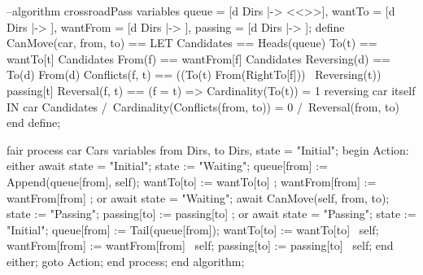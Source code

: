 \documentclass[14pt, openany]{book}
\begin{document}
\begin{ppcal}
--algorithm crossroadPass
variables
  queue = [d \in Dirs |-> <<>>],
  wantTo = [d \in Dirs |-> {}],
  wantFrom = [d \in Dirs |-> {}],
  passing = [d \in Dirs |-> {}];
define
  CanMove(car, from, to) == 
    LET
      Candidates == Heads(queue)
      To(t) == wantTo[t] \intersect Candidates
      From(f) == wantFrom[f] \intersect Candidates
      Reversing(d) == To(d) \intersect From(d) 
      Conflicts(f, t) == ((To(t) \intersect From(RightTo[f])) \ Reversing(t)) \union passing[t]
      Reversal(f, t) == (f = t) => Cardinality(To(t)) = 1 \* reversing car itself
    IN
    car \in Candidates /\
    Cardinality(Conflicts(from, to)) = 0 /\
    Reversal(from, to)
end define;

fair process car \in Cars
variables
  from \in Dirs, to \in Dirs, state = "Initial";
begin
  Action:
    either
      await state = "Initial";
      state := "Waiting";
      queue[from] := Append(queue[from], self);
      wantTo[to] := wantTo[to] ;
      wantFrom[from] := wantFrom[from] ;
    or
      await state = "Waiting";
      await CanMove(self, from, to);
      state := "Passing";
      passing[to] := passing[to] ;
    or
      await state = "Passing";
      state := "Initial";
      queue[from] := Tail(queue[from]);
      wantTo[to] := wantTo[to] \ {self};
      wantFrom[from] := wantFrom[from] \ {self};
      passing[to] := passing[to] \ {self};
    end either;
    goto Action;
end process;
end algorithm;
\end{ppcal}
\end{document}
